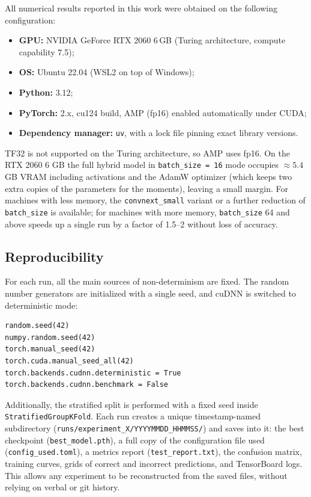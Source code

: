 \documentclass[14pt,a4paper]{extreport}
\begin{document}
All numerical results reported in this work were obtained on the
following configuration:
\begin{itemize}
    \item \textbf{GPU:} NVIDIA GeForce RTX 2060 6\,GB (Turing
          architecture, compute capability 7.5);
    \item \textbf{OS:} Ubuntu 22.04 (WSL2 on top of Windows);
    \item \textbf{Python:} 3.12;
    \item \textbf{PyTorch:} 2.x, cu124 build, AMP (fp16) enabled
          automatically under CUDA;
    \item \textbf{Dependency manager:} \texttt{uv}, with a lock file
          pinning exact library versions.
\end{itemize}
TF32 is not supported on the Turing architecture, so AMP uses fp16. On
the RTX 2060 6 GB the full hybrid model in \texttt{batch\_size = 16}
mode occupies $\approx 5.4$ GB VRAM including activations and the AdamW
optimizer (which keeps two extra copies of the parameters for the
moments), leaving a small margin. For machines with less memory, the
\texttt{convnext\_small} variant or a further reduction of
\texttt{batch\_size} is available; for machines with more memory,
\texttt{batch\_size} 64 and above speeds up a single run by a factor of
1.5--2 without loss of accuracy.

\subsection{Reproducibility}

For each run, all the main sources of non-determinism are fixed. The
random number generators are initialized with a single seed, and cuDNN
is switched to deterministic mode:
\begin{lstlisting}
random.seed(42)
numpy.random.seed(42)
torch.manual_seed(42)
torch.cuda.manual_seed_all(42)
torch.backends.cudnn.deterministic = True
torch.backends.cudnn.benchmark = False
\end{lstlisting}
Additionally, the stratified split is performed with a fixed seed inside
\texttt{StratifiedGroupKFold}. Each run creates a unique
timestamp-named subdirectory
(\texttt{runs/experiment\_X/YYYYMMDD\_HHMMSS/}) and saves into it: the
best checkpoint (\texttt{best\_model.pth}), a full copy of the
configuration file used (\texttt{config\_used.toml}), a metrics report
(\texttt{test\_report.txt}), the confusion matrix, training curves,
grids of correct and incorrect predictions, and TensorBoard logs. This
allows any experiment to be reconstructed from the saved files, without
relying on verbal or git history.
\end{document}
